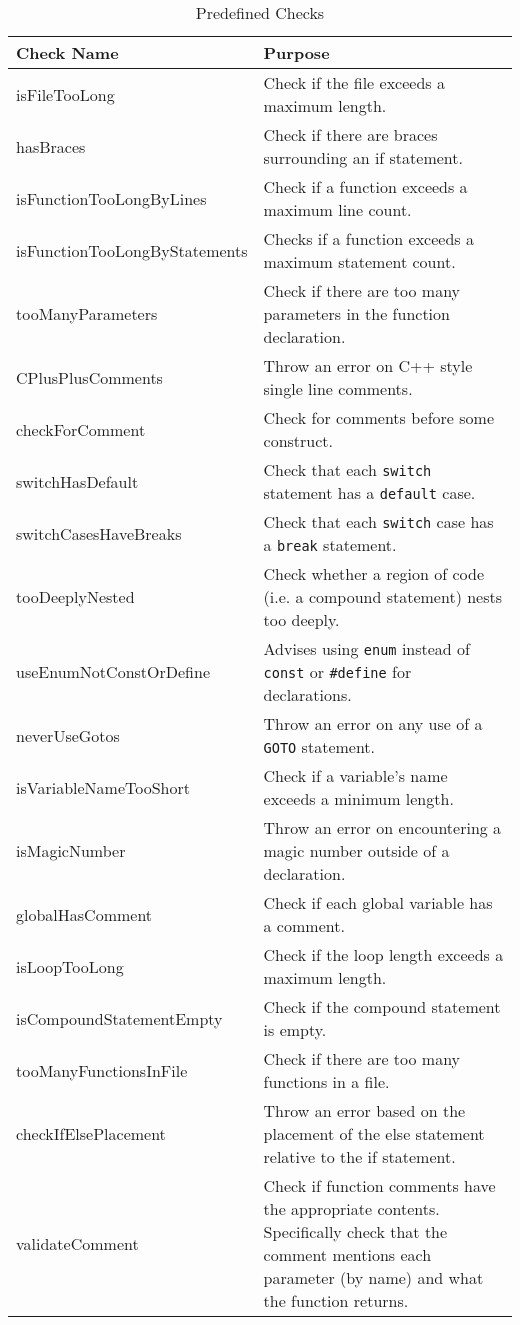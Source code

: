 \documentclass[12pt]{report}
\begin{document}
\begin{table}
\caption{Predefined Checks}
\label{predefinedChecks}
	\begin{center}
	\begin{tabular}{l p{10cm}}
		\toprule
		Check Name & Purpose \\
		\midrule
		isFileTooLong & Check if the file exceeds a maximum length. \\
		hasBraces & Check if there are braces surrounding an if statement. \\
		isFunctionTooLongByLines & Check if a function exceeds a maximum line count. \\
		isFunctionTooLongByStatements & Checks if a function exceeds a maximum statement count. \\
		tooManyParameters & Check if there are too many parameters in the function declaration. \\
		CPlusPlusComments & Throw an error on C++ style single line comments. \\
		checkForComment & Check for comments before some construct. \\
		switchHasDefault & Check that each \lstinline!switch! statement has a \lstinline!default! case. \\
		switchCasesHaveBreaks & Check that each \lstinline!switch! case has a \lstinline!break! statement. \\
		tooDeeplyNested & Check whether a region of code (i.e. a compound statement) nests too deeply. \\
		useEnumNotConstOrDefine & Advises using \lstinline!enum! instead of \lstinline!const! or \lstinline!#define! for declarations. \\
		neverUseGotos & Throw an error on any use of a \lstinline!GOTO! statement. \\
		isVariableNameTooShort & Check if a variable's name exceeds a minimum length. \\
		isMagicNumber & Throw an error on encountering a magic number outside of a declaration. \\
		globalHasComment & Check if each global variable has a comment. \\
		isLoopTooLong & Check if the loop length exceeds a maximum length. \\
		isCompoundStatementEmpty  & Check if the compound statement is empty. \\
		tooManyFunctionsInFile & Check if there are too many functions in a file. \\
		checkIfElsePlacement & Throw an error based on the placement of the else statement relative to the if statement.  \\
		validateComment & Check if function comments have the appropriate contents. Specifically check that the comment mentions each parameter (by name) and what the function returns. \\
		\bottomrule
	\end{tabular}
	\end{center}
\end{table}
\end{document}
